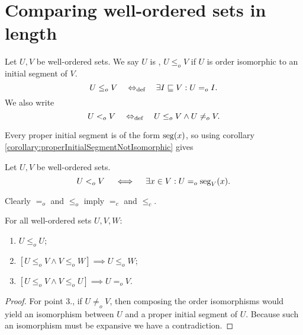 \section{Comparing well-ordered sets in length}
\begin{definition}
Let $U,V$ be well-ordered sets. We say $U$ is , $U\leq_o V$ if $U$ is order isomorphic to an initial segment of $V$.
\[ U\leq_o V \quad\Leftrightarrow_{\text{def}}\quad \exists I\sqsubseteq V: U =_o I. \]
We also write
\[ U <_o V \quad\Leftrightarrow_{\text{def}}\quad U\leq_o V \land U\neq_o V. \]
\end{definition}
Every proper initial segment is of the form $\operatorname{seg}(x)$, so using corollary \ref{corollary:properInitialSegmentNotIsomorphic} gives
\begin{lemma}
Let $U,V$ be well-ordered sets.
\[ U <_o V \quad \iff \quad \exists x\in V: U =_o \operatorname{seg}_V(x). \]
\end{lemma}

Clearly $=_o$ and $\leq_o$ imply $=_c$ and $\leq_c$.

\begin{lemma} \label{lemma:preorderingWosets}
For all well-ordered sets $U,V,W$:
\begin{enumerate}
\item $U \leq_o U$;
\item $[U\leq_o V \land V\leq_o W] \implies U\leq_o W$;
\item $[U \leq_o V \land V \leq_o U] \implies U =_o V$.
\end{enumerate}
\end{lemma}
\begin{proof}
For point 3., if $U \neq_o V$, then composing the order isomorphisms would yield an isomorphism between $U$ and a proper initial segment of $U$. Because such an isomorphism must be expansive we have a contradiction.
\end{proof}

